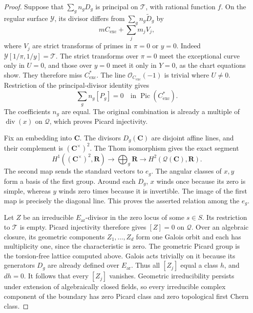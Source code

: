 \documentclass[11pt,a4paper]{amsart}
\numberwithin{equation}{section}
\theoremstyle{definition}
\theoremstyle{remark}
\newcommand{\DtwoRR}{\mathbf{R}}
\newcommand{\DtwoCC}{\mathbf{C}}
\newcommand{\DtwocO}{\mathcal O}
\newcommand{\DtwocQ}{\mathcal Q}
\newcommand{\DtwocT}{\mathcal T}
\newcommand{\DtwocY}{\mathcal Y}
\newcommand{\Dtwowt}{\widetilde}
\newcommand{\Dtwoar}{\mathrm{ar}}
\DeclareMathOperator{\DtwoPic}{Pic}
\DeclareMathOperator{\Dtwodivisor}{div}
\begin{document}
\begin{proof}
Suppose that \(\sum_g n_gD_g\) is principal on \(\DtwocT\), with
rational function \(f\).
On the regular surface \(\DtwocY\), its divisor differs from
\(\sum_g n_g\Dtwowt D_g\) by
\[
 mC_{\mathrm{exc}}+\sum_jm_jV_j,
\]
where \(V_j\) are strict transforms of primes in \(\pi=0\) or \(y=0\).
Indeed \(\DtwocY[1/\pi,1/y]=\DtwocT\).
The strict transforms over \(\pi=0\) meet the exceptional curve only
in \(U=0\), and those over \(y=0\) meet it only in \(Y=0\), as the
chart equations show.
They therefore miss \(C_{\mathrm{exc}}^*\).
The line \(\DtwocO_{C_{\mathrm{exc}}}(-1)\) is trivial where \(U\ne0\).
Restriction of the principal-divisor identity gives
\[
 \sum_g n_g[P_g]=0\quad\text{in }\DtwoPic(C_{\mathrm{exc}}^*).
\]
The coefficients \(n_g\) are equal.
The original combination is already a multiple of \(\Dtwodivisor(x)\)
on \(\DtwocQ\), which proves Picard injectivity.

Fix an embedding into \(\DtwoCC\).
The divisors \(D_g(\DtwoCC)\) are disjoint affine lines, and their
complement is \((\DtwoCC^\times)^2\).
The Thom isomorphism gives the exact segment
\[
 H^1((\DtwoCC^\times)^2,\DtwoRR)
 \longrightarrow \bigoplus_g\DtwoRR
 \longrightarrow H^2(\DtwocQ(\DtwoCC),\DtwoRR).
\]
The second map sends the standard vectors to \(e_g\).
The angular classes of \(x,y\) form a basis of the first group.
Around each \(D_g\), \(x\) winds once because its zero is simple,
whereas \(y\) winds zero times because it is invertible.
The image of the first map is precisely the diagonal line.
This proves the asserted relation among the \(e_g\).

Let \(Z\) be an irreducible \(E_{\Dtwoar}\)-divisor in the zero locus of
some \(s\in S\).
Its restriction to \(\DtwocT\) is empty.
Picard injectivity therefore gives \([Z]=0\) on \(\DtwocQ\).
Over an algebraic closure, its geometric components
\(Z_1,\ldots,Z_d\) form one Galois orbit and each has multiplicity
one, since the characteristic is zero.
The geometric Picard group is the torsion-free lattice computed
above. Galois acts trivially on it because its generators \(D_g\)
are already defined over \(E_{\Dtwoar}\).
Thus all \([Z_j]\) equal a class \(h\), and \(dh=0\).
It follows that every \([Z_j]\) vanishes.
Geometric irreducibility persists under extension of algebraically
closed fields, so every irreducible complex component of the boundary
has zero Picard class and zero topological first Chern class.


\end{proof}
\end{document}
